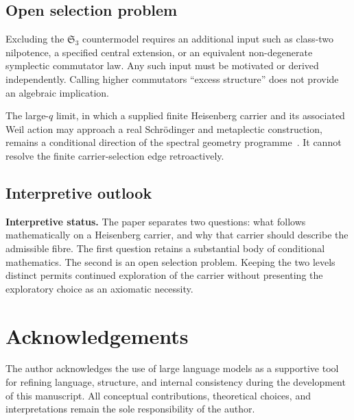 \documentclass[11pt,a4paper]{article}
\newcommand{\Sym}{\mathfrak{S}}
\begin{document}
  \subsection{Open selection problem}

    Excluding the $\Sym_3$ countermodel requires an additional input such as
    class-two nilpotence, a specified central extension, or an equivalent
    non-degenerate symplectic commutator law.
    Any such input must be motivated or derived independently.
    Calling higher commutators ``excess structure'' does not provide an algebraic
    implication.

    The large-$q$ limit, in which a supplied finite Heisenberg carrier and its
    associated Weil action may approach a real Schr\"odinger and metaplectic
    construction, remains a conditional direction of the spectral geometry
    programme~\cite{Cosmochrony}.
    It cannot resolve the finite carrier-selection edge retroactively.

  \subsection*{Interpretive outlook}

    \textbf{Interpretive status.}
    The paper separates two questions: what follows mathematically on a
    Heisenberg carrier, and why that carrier should describe the admissible
    fibre.
    The first question retains a substantial body of conditional mathematics.
    The second is an open selection problem.
    Keeping the two levels distinct permits continued exploration of the carrier
    without presenting the exploratory choice as an axiomatic necessity.

  \section*{Acknowledgements}

  The author acknowledges the use of large language models as a supportive tool
  for refining language, structure, and internal consistency during the development
  of this manuscript.
  All conceptual contributions, theoretical choices, and interpretations remain
  the sole responsibility of the author.

  
      
\end{document}
